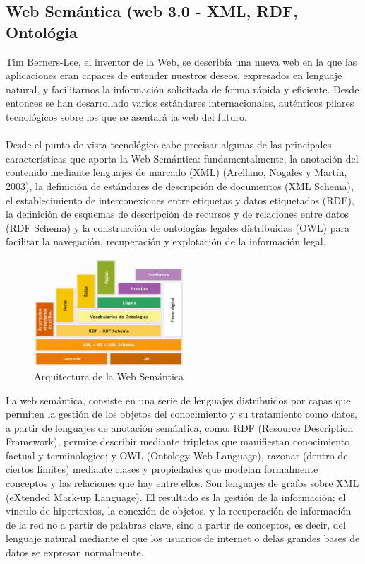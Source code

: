 \documentclass[conference]{IEEEtran}
\begin{document}
 
 \subsection{Web Semántica (web 3.0 - XML, RDF, Ontológia}  
    Tim Berners-Lee, el inventor de la Web, se describía una nueva web en la que las aplicaciones eran capaces de entender nuestros deseos, expresados en lenguaje natural, y facilitarnos la información solicitada de forma rápida y eficiente. Desde entonces se han desarrollado varios estándares internacionales, auténticos pilares tecnológicos sobre los que se asentará la web del futuro.\\ \\
    Desde el punto de vista tecnológico cabe precisar algunas de las principales características que aporta la Web Semántica: fundamentalmente, la anotación del contenido mediante lenguajes de marcado (XML) (Arellano, Nogales y Martín, 2003), la definición de estándares de descripción de documentos (XML Schema), el establecimiento de interconexiones entre etiquetas y datos etiquetados (RDF), la definición de esquemas de descripción de recursos y de relaciones entre datos (RDF Schema) y la construcción de ontologías legales distribuidas (OWL) para facilitar la navegación, recuperación y explotación de la información legal.
    \begin{figure}[h]
    	\centering
    	\includegraphics[width=0.5\textwidth]{ws-arquitectura2}
    	\caption{Arquitectura de la Web Semántica}
    \end{figure}
    La web semántica, consiste en una serie de lenguajes distribuidos por capas que permiten la gestión de los objetos del conocimiento y su tratamiento como datos, a partir de lenguajes de anotación semántica, como: RDF (Resource Description Framework), permite describir mediante tripletas que manifiestan conocimiento factual y terminologico; y OWL (Ontology Web Language), razonar (dentro de ciertos límites) mediante clases y propiedades que modelan formalmente conceptos y las relaciones que hay entre ellos. Son lenguajes de grafos sobre XML (eXtended Mark-up Language).  El resultado es la gestión de la información: el vínculo de hipertextos, la conexión de objetos, y la recuperación de información de la red no a partir de palabras clave, sino a partir de conceptos, es decir, del lenguaje natural mediante el que los usuarios de internet o delas grandes bases de datos se expresan normalmente. \\ \\
\end{document}
